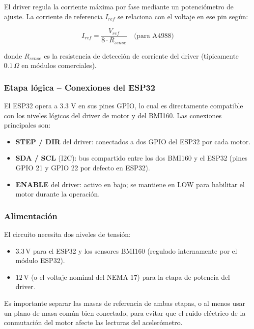 El driver regula la corriente máxima por fase mediante un potenciómetro de ajuste. La
corriente de referencia $I_{ref}$ se relaciona con el voltaje en ese pin según:

\begin{equation}
	I_{ref} = \frac{V_{ref}}{8 \cdot R_{sense}} \quad \text{(para A4988)}
\end{equation}

donde $R_{sense}$ es la resistencia de detección de corriente del driver (típicamente
$0.1\,\Omega$ en módulos comerciales).
\subsubsection{Etapa lógica -- Conexiones del ESP32}

El ESP32 opera a 3.3 V en sus pines GPIO, lo cual es directamente compatible con los
niveles lógicos del driver de motor y del BMI160. Las conexiones principales son:

\begin{itemize}
	\item \textbf{STEP / DIR} del driver: conectados a dos GPIO del ESP32 por cada motor.
	\item \textbf{SDA / SCL} (I2C): bus compartido entre los dos BMI160 y el ESP32
	(pines GPIO 21 y GPIO 22 por defecto en ESP32).
	\item \textbf{ENABLE} del driver: activo en bajo; se mantiene en LOW para habilitar
	el motor durante la operación.
\end{itemize}
\subsubsection{Alimentación}


El circuito necesita dos niveles de tensión:

\begin{itemize}
	\item $3.3\,\text{V}$ para el ESP32 y los sensores BMI160 (regulado internamente
	por el módulo ESP32).
	\item $12\,\text{V}$ (o el voltaje nominal del NEMA 17) para la etapa de potencia
	del driver.
\end{itemize}

Es importante separar las masas de referencia de ambas etapas, o al menos usar un plano
de masa común bien conectado, para evitar que el ruido eléctrico de la conmutación del
motor afecte las lecturas del acelerómetro.

% 
